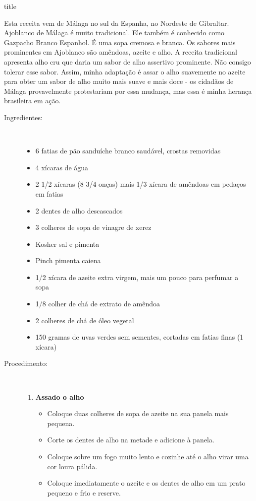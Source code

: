 \documentclass [11pt, letterpaper] {article}
\begin{document}
 {title}

Esta receita vem de Málaga no sul da Espanha, no Nordeste de Gibraltar. Ajoblanco de Málaga \'e muito tradicional. Ele tamb\'em é conhecido como Gazpacho Branco Espanhol. É uma sopa cremosa e branca. Os sabores mais prominentes em Ajoblanco são amêndoas, azeite e alho. A receita tradicional apresenta alho cru que daria um sabor de alho assertivo prominente. Não consigo tolerar esse sabor. Assim, minha adaptação é assar o alho suavemente no azeite para obter um sabor de alho muito mais suave e mais doce - os cidadãos de Málaga provavelmente protestariam por essa mudança, mas essa é minha herança brasileira em ação.


\begin {description}

\item [Ingredientes:] \ \\
\begin {itemize}
\item 6 fatias de pão sanduíche branco saudável, crostas removidas
\item 4 xícaras de água
\item 2 1/2 xícaras (8 3/4 onças) mais 1/3 xícara de amêndoas em pedaços em fatias
\item 2 dentes de alho descascados
\item 3 colheres de sopa de vinagre de xerez
\item Kosher sal e pimenta
\item Pinch pimenta caiena
\item 1/2 xícara de azeite extra virgem, mais um pouco para perfumar a sopa
\item 1/8 colher de chá de extrato de amêndoa
\item 2 colheres de chá de óleo vegetal
\item 150 gramas de uvas verdes sem sementes, cortadas em fatias finas (1 xícara)
\end {itemize}


\item [Procedimento:] \ \\

\begin {enumerate}
\item {\bf Assado o alho}
\begin {itemize}
\item Coloque duas colheres de sopa de azeite na sua panela mais pequena.
\item Corte os dentes de alho na metade e adicione à panela.
\item Coloque sobre um fogo muito lento e cozinhe até o alho virar uma cor loura pálida.
\item Coloque imediatamente o azeite e os dentes de alho em um prato pequeno e frio e reserve.
\end {itemize}


\end{enumerate}
\end{description}
\end{document}
